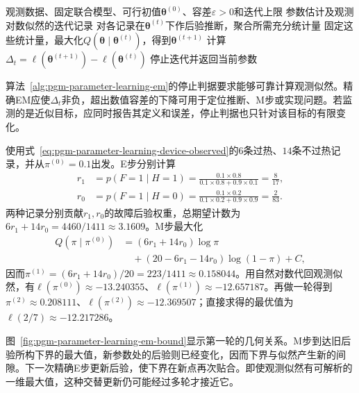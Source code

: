 \begin{algorithm}[利用后验充分统计量的EM]
  \label{alg:pgm-parameter-learning-em}
  \begin{algorithmic}[1]
    \Require 观测数据、固定联合模型、可行初值$\bm{\theta}^{(0)}$、容差$\varepsilon>0$和迭代上限
    \Ensure 参数估计及观测对数似然的迭代记录
      \State 对各记录在$\bm{\theta}^{(t)}$下作后验推断，聚合所需充分统计量
      \State 固定这些统计量，最大化$Q(\bm{\theta}\mid\bm{\theta}^{(t)})$，得到$\bm{\theta}^{(t+1)}$
      \State 计算$\Delta_t=\ell(\bm{\theta}^{(t+1)})-\ell(\bm{\theta}^{(t)})$
        \State 停止迭代并返回当前参数
      \EndIf
    \EndFor
  \end{algorithmic}
\end{algorithm}

算法~\ref{alg:pgm-parameter-learning-em}的停止判据要求能够可靠计算观测似然。精确EM应使$\Delta_t$非负，超出数值容差的下降可用于定位推断、M步或实现问题。若监测的是近似目标，应同时报告其定义和误差，停止判据也只针对该目标的有限变化。

\begin{example}[由过热记录学习故障率]
  \label{ex:pgm-parameter-learning-device-em}
  使用式~\eqref{eq:pgm-parameter-learning-device-observed}的$6$条过热、$14$条不过热记录，并从$\pi^{(0)}=0.1$出发。E步分别计算
  \[
    \begin{aligned}
      r_1&=p(F=1\mid H=1)
        =\frac{0.1\times0.8}{0.1\times0.8+0.9\times0.1}
        =\frac{8}{17},\\
      r_0&=p(F=1\mid H=0)
        =\frac{0.1\times0.2}{0.1\times0.2+0.9\times0.9}
        =\frac{2}{83}.
    \end{aligned}
  \]
  两种记录分别贡献$r_1,r_0$的故障后验权重，总期望计数为$6r_1+14r_0=4460/1411\approx3.1609$。M步最大化
  \[
    \begin{aligned}
      Q(\pi\mid\pi^{(0)})
        &=(6r_1+14r_0)\log\pi\\
        &\quad+(20-6r_1-14r_0)\log(1-\pi)+C,
    \end{aligned}
  \]
  因而$\pi^{(1)}=(6r_1+14r_0)/20=223/1411\approx0.158044$。用自然对数代回观测似然，有$\ell(\pi^{(0)})\approx-13.240355$、$\ell(\pi^{(1)})\approx-12.657187$。再做一轮得到$\pi^{(2)}\approx0.208111$、$\ell(\pi^{(2)})\approx-12.369507$；直接求得的最优值为$\ell(2/7)\approx-12.217286$。
\end{example}

图~\ref{fig:pgm-parameter-learning-em-bound}显示第一轮的几何关系。M步到达旧后验所构下界的最大值，新参数处的后验则已经变化，因而下界与似然产生新的间隙。下一次精确E步更新后验，使下界在新点再次贴合。即使观测似然有可解析的一维最大值，这种交替更新仍可能经过多轮才接近它。


